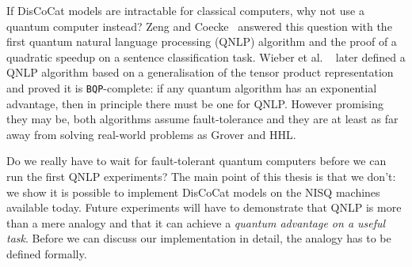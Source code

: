 If DisCoCat models are intractable for classical computers, why not use a quantum computer instead?
Zeng and Coecke~\cite{ZengCoecke16} answered this question with the first quantum natural language processing (QNLP) algorithm and the proof of a quadratic speedup on a sentence classification task.
Wieber et al. ~\cite{WiebeEtAl19} later defined a QNLP algorithm based on a generalisation of the tensor product representation and proved it is \texttt{BQP}-complete: if any quantum algorithm has an exponential advantage, then in principle there must be one for QNLP.
However promising they may be, both algorithms assume fault-tolerance and they are at least as far away from solving real-world problems as Grover and HHL.

Do we really have to wait for fault-tolerant quantum computers before we can run the first QNLP experiments?
The main point of this thesis is that we don't: we show it is possible to implement DisCoCat models on the NISQ machines available today.
Future experiments will have to demonstrate that QNLP is more than a mere analogy and that it can achieve a \emph{quantum advantage on a useful task}.
Before we can discuss our implementation in detail, the analogy has to be defined formally.
